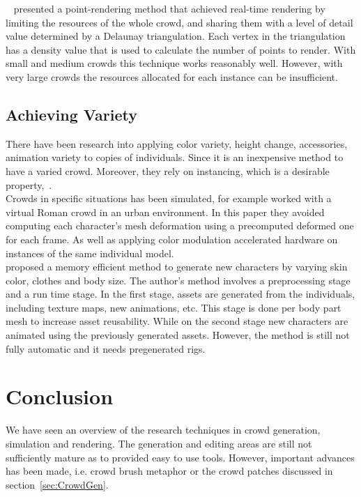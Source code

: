 \documentclass[6pt]{article} %
\begin{document}
\begin{multicols}{2}
~\cite{Larkin2010} presented a point-rendering method that achieved real-time rendering by limiting the resources of the whole crowd, and sharing them with a level of detail value determined by a Delaunay triangulation. 
Each vertex in the triangulation has a density value that is used to calculate the number of points to render.
With small and medium crowds this technique works reasonably well.
However, with very large crowds the resources allocated for each instance can be insufficient.

\subsection{Achieving Variety}

There have been research into applying color variety, height change, accessories, animation variety to copies of individuals.
Since it is an inexpensive method to have a varied crowd.
Moreover, they rely on instancing, which is a desirable property,~\cite{zelsnack2004glsl}.\\

Crowds in specific situations has been simulated, for example \cite{deHeras2005} worked with a virtual Roman crowd in an urban environment.
In this paper they avoided computing each character’s mesh deformation using a precomputed deformed one for each frame. As well as applying color modulation accelerated hardware on instances of the same individual model.\\

\cite{ruiz2013} proposed a memory efficient method to generate new characters by varying skin color, clothes and body size.
The author's method involves a preprocessing stage and a run time stage.
In the first stage, assets are generated from the individuals, including texture maps, new animations, etc.
This stage is done per body part mesh to increase asset reusability.
While on the second stage new characters are animated using the previously generated assets.
However, the method is still not fully automatic and it needs pregenerated rigs.

\section{Conclusion}
We have seen an overview of the research techniques in crowd generation, simulation and rendering.
The generation and editing areas are still not sufficiently mature as to provided easy to use tools.
However, important advances has been made, i.e. crowd brush metaphor or the crowd patches discussed in section~\ref{sec:CrowdGen}.\\


\end{multicols}
\end{document}
